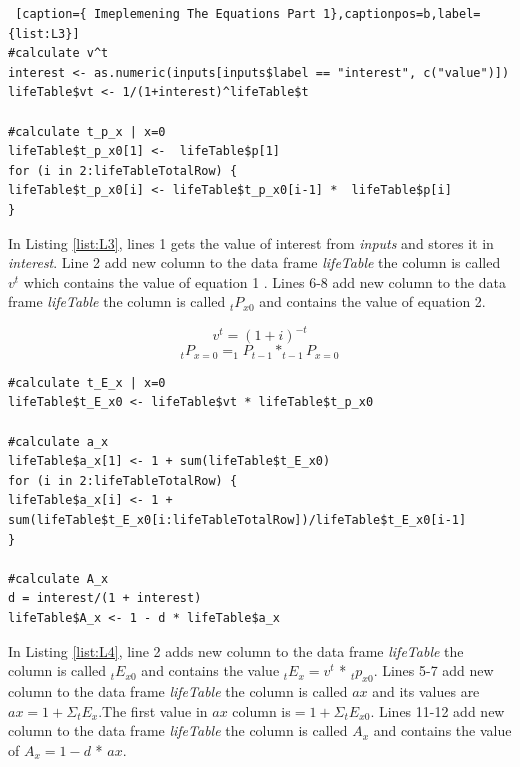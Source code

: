 \documentclass[12pt]{article}
\def\StartLineAtOne{\lstset{firstnumber=1}}
\begin{document}
\pagebreak
\StartLineAtOne
\begin{lstlisting} [caption={ Imeplemening The Equations Part 1},captionpos=b,label={list:L3}]
#calculate v^t
interest <- as.numeric(inputs[inputs$label == "interest", c("value")])
lifeTable$vt <- 1/(1+interest)^lifeTable$t

#calculate t_p_x | x=0
lifeTable$t_p_x0[1] <-  lifeTable$p[1]
for (i in 2:lifeTableTotalRow) {
lifeTable$t_p_x0[i] <- lifeTable$t_p_x0[i-1] *  lifeTable$p[i]
}
\end{lstlisting}
In Listing \ref{list:L3}, lines 1 gets the value of interest from \textit{inputs} and stores it in \textit{interest}. Line 2 add new column to the data frame \textit{lifeTable} the column is called $v^{t}$ which contains the value of equation 1 . Lines 6-8 add new column to the data frame \textit{lifeTable} the column is called $_{t}P_{x0}$ and contains the value of equation 2.

\begin{equation}
v^t=(1+i)^{-t}
\end{equation}
\begin{equation}
 _{t}P_{x=0}=_{1}P_{t-1} * _{t-1}P_{x=0}
\end{equation}

\StartLineAtOne
\begin{lstlisting}[caption={Imeplemening The Equations Part 2},captionpos=b,label={list:L4}]
#calculate t_E_x | x=0
lifeTable$t_E_x0 <- lifeTable$vt * lifeTable$t_p_x0

#calculate a_x
lifeTable$a_x[1] <- 1 + sum(lifeTable$t_E_x0)
for (i in 2:lifeTableTotalRow) {
lifeTable$a_x[i] <- 1 + sum(lifeTable$t_E_x0[i:lifeTableTotalRow])/lifeTable$t_E_x0[i-1]
}

#calculate A_x
d = interest/(1 + interest)
lifeTable$A_x <- 1 - d * lifeTable$a_x
\end{lstlisting}
In Listing \ref{list:L4}, line 2 adds new column to the data frame \textit{lifeTable} the column is called $_{t}E_{x0}$ and contains the value $_{t}E_{x}=v^t$ *  $_{t}p_{x0}$. Lines 5-7 add new column to the data frame \textit{lifeTable} the column is called $ax$ and its values are $ax=1+\Sigma _{t}E_{x}$.The first value in  $ax$ column is$=1+\Sigma _{t}E_{x0}$. Lines 11-12 add new column to the data frame \textit{lifeTable} the column is called $A_{x}$ and contains the value of $A_{x}=1-d$ * $ax$.
\end{document}
